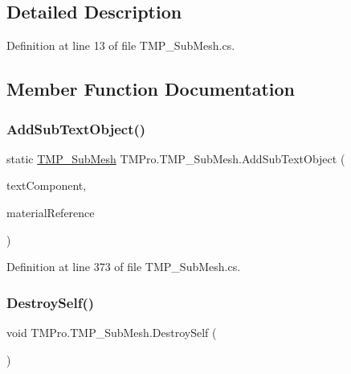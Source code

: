 \subsection{Detailed Description}


Definition at line 13 of file T\+M\+P\+\_\+\+Sub\+Mesh.\+cs.



\subsection{Member Function Documentation}
\mbox{\label{class_t_m_pro_1_1_t_m_p___sub_mesh_aab11f751e99fd3566e382584cc334a4d}} 
\subsubsection{\texorpdfstring{AddSubTextObject()}{AddSubTextObject()}}
{\footnotesize\ttfamily static \mbox{\hyperlink{class_t_m_pro_1_1_t_m_p___sub_mesh}{T\+M\+P\+\_\+\+Sub\+Mesh}} T\+M\+Pro.\+T\+M\+P\+\_\+\+Sub\+Mesh.\+Add\+Sub\+Text\+Object (\begin{DoxyParamCaption}\item[{\mbox{\hyperlink{class_t_m_pro_1_1_text_mesh_pro}{Text\+Mesh\+Pro}}}]{text\+Component,  }\item[{\mbox{\hyperlink{struct_t_m_pro_1_1_material_reference}{Material\+Reference}}}]{material\+Reference }\end{DoxyParamCaption})\hspace{0.3cm}{\ttfamily [static]}}



Definition at line 373 of file T\+M\+P\+\_\+\+Sub\+Mesh.\+cs.

\mbox{\label{class_t_m_pro_1_1_t_m_p___sub_mesh_a373007bf6b71e0134f7f3980f841775b}} 
\subsubsection{\texorpdfstring{DestroySelf()}{DestroySelf()}}
{\footnotesize\ttfamily void T\+M\+Pro.\+T\+M\+P\+\_\+\+Sub\+Mesh.\+Destroy\+Self (\begin{DoxyParamCaption}{ }\end{DoxyParamCaption})}



